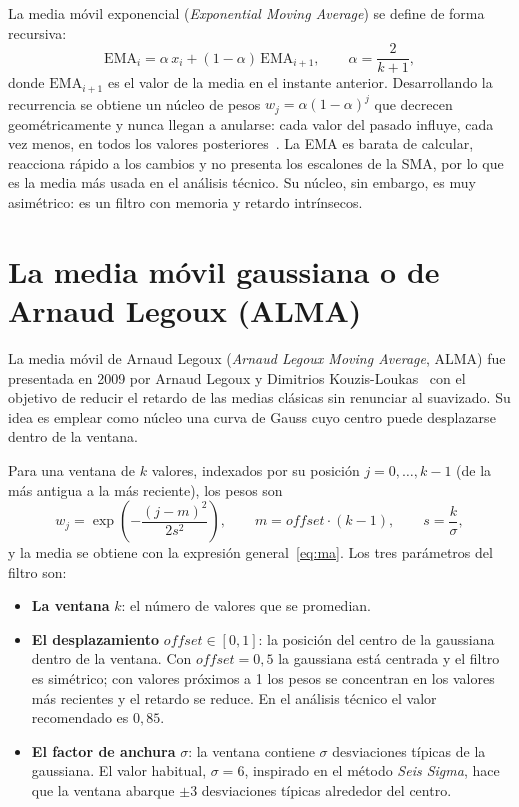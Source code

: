 \documentclass[11pt,a4paper]{article}
\begin{document}
La media móvil exponencial (\emph{Exponential Moving Average}) se define de
forma recursiva:
\begin{equation}
    \mathrm{EMA}_i = \alpha\, x_i + (1 - \alpha)\, \mathrm{EMA}_{i+1},
    \qquad \alpha = \frac{2}{k + 1},
\end{equation}
donde $\mathrm{EMA}_{i+1}$ es el valor de la media en el instante anterior.
Desarrollando la recurrencia se obtiene un núcleo de pesos
$w_j = \alpha (1-\alpha)^j$ que decrecen geométricamente y nunca llegan a
anularse: cada valor del pasado influye, cada vez menos, en todos los valores
posteriores~\cite{hunter}. La EMA es barata de calcular, reacciona rápido a los cambios y no
presenta los escalones de la SMA, por lo que es la media más usada en el
análisis técnico. Su núcleo, sin embargo, es muy asimétrico: es un filtro con
memoria y retardo intrínsecos.

\section{La media móvil gaussiana o de Arnaud Legoux (ALMA)}

La media móvil de Arnaud Legoux (\emph{Arnaud Legoux Moving Average}, ALMA) fue
presentada en 2009 por Arnaud Legoux y Dimitrios
Kouzis-Loukas~\cite{legoux,tradingview} con el objetivo
de reducir el retardo de las medias clásicas sin renunciar al suavizado. Su
idea es emplear como núcleo una curva de Gauss cuyo centro puede desplazarse
dentro de la ventana.

Para una ventana de $k$ valores, indexados por su posición $j = 0, \dots, k-1$
(de la más antigua a la más reciente), los pesos son
\begin{equation}
    w_j = \exp\left(-\frac{(j - m)^2}{2 s^2}\right),
    \qquad
    m = \textit{offset} \cdot (k - 1),
    \qquad
    s = \frac{k}{\sigma},
    \label{eq:alma}
\end{equation}
y la media se obtiene con la expresión general~\eqref{eq:ma}. Los tres
parámetros del filtro son:
\begin{itemize}
    \item \textbf{La ventana} $k$: el número de valores que se promedian.
    \item \textbf{El desplazamiento} $\textit{offset} \in [0, 1]$: la posición
          del centro de la gaussiana dentro de la ventana. Con
          $\textit{offset} = 0{,}5$ la gaussiana está centrada y el filtro es
          simétrico; con valores próximos a 1 los pesos se concentran en los
          valores más recientes y el retardo se reduce. En el análisis técnico
          el valor recomendado es $0{,}85$.
    \item \textbf{El factor de anchura} $\sigma$: la ventana contiene
          $\sigma$ desviaciones típicas de la gaussiana. El valor habitual,
          $\sigma = 6$, inspirado en el método \emph{Seis Sigma}, hace que la
          ventana abarque $\pm 3$ desviaciones típicas alrededor del centro.
\end{itemize}
\end{document}
